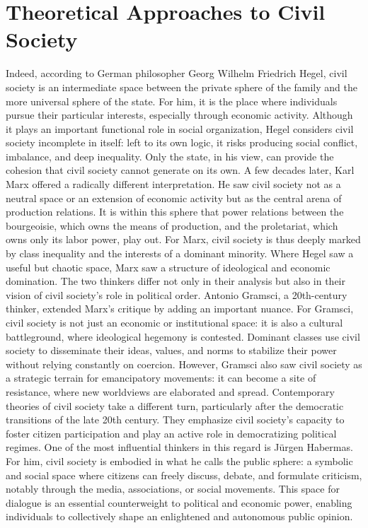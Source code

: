 \documentclass[12pt]{article}
\begin{document}
\section{Theoretical Approaches to Civil Society}

Indeed, according to German philosopher Georg Wilhelm Friedrich Hegel, civil society is an intermediate space between the private sphere of the family and the more universal sphere of the state. For him, it is the place where individuals pursue their particular interests, especially through economic activity. Although it plays an important functional role in social organization, Hegel considers civil society incomplete in itself: left to its own logic, it risks producing social conflict, imbalance, and deep inequality. Only the state, in his view, can provide the cohesion that civil society cannot generate on its own.
A few decades later, Karl Marx offered a radically different interpretation. He saw civil society not as a neutral space or an extension of economic activity but as the central arena of production relations. It is within this sphere that power relations between the bourgeoisie, which owns the means of production, and the proletariat, which owns only its labor power, play out. For Marx, civil society is thus deeply marked by class inequality and the interests of a dominant minority. Where Hegel saw a useful but chaotic space, Marx saw a structure of ideological and economic domination. The two thinkers differ not only in their analysis but also in their vision of civil society’s role in political order.
Antonio Gramsci, a 20th-century thinker, extended Marx’s critique by adding an important nuance. For Gramsci, civil society is not just an economic or institutional space: it is also a cultural battleground, where ideological hegemony is contested. Dominant classes use civil society to disseminate their ideas, values, and norms to stabilize their power without relying constantly on coercion. However, Gramsci also saw civil society as a strategic terrain for emancipatory movements: it can become a site of resistance, where new worldviews are elaborated and spread.
Contemporary theories of civil society take a different turn, particularly after the democratic transitions of the late 20th century. They emphasize civil society’s capacity to foster citizen participation and play an active role in democratizing political regimes. One of the most influential thinkers in this regard is Jürgen Habermas. For him, civil society is embodied in what he calls the public sphere: a symbolic and social space where citizens can freely discuss, debate, and formulate criticism, notably through the media, associations, or social movements. This space for dialogue is an essential counterweight to political and economic power, enabling individuals to collectively shape an enlightened and autonomous public opinion.
\end{document}
